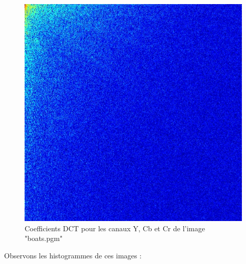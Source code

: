 \documentclass[12pt]{report}
\begin{document}
\begin{figure}[H]
\begin{center}
\includegraphics[scale=0.25]{../ImageRes/dct_2.jpg} 
\caption{Coefficients DCT pour les canaux Y, Cb et Cr de l'image "boats.pgm"}
\end{center}
\end{figure}

Observons les histogrammes de ces images :
\end{document}
